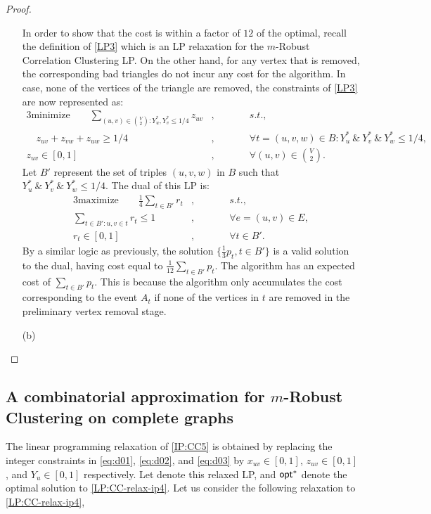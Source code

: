 \begin{proof}
\begin{enumerate}
In order to show that the cost is within a factor of $12$ of the optimal, recall the definition of \ref{LP3} which is an LP relaxation for the $m$-Robust Correlation Clustering LP. 
On the other hand, for any vertex that is removed, the corresponding bad triangles do not incur any cost for the algorithm. In case, none of the vertices of the triangle are removed, the constraints of \ref{LP3} are now represented as:
\begin{alignat}{3} \label{LP:CC-relax-reduced:2}
		\text{minimize} \qquad \sum_{(u,v) \in \binom{V}{2} : Y_u^*, Y_v^* \le 1/4} z_{uv}&, \qquad &&s.t., \nonumber\\
		\quad z_{uv} + z_{vw} + z_{uw} \ge 1/4 &, \qquad &&\forall t = (u,v,w) \in B : Y_u^* \ \&\ Y_v^* \ \&\ Y_w^* \le 1/4, \nonumber\\
		z_{uv} \in [ 0,1 ]&, \qquad &&\forall (u,v) \in \binom{V}{2}. \tag{LP4}
\end{alignat}
Let $B'$ represent the set of triples $(u,v,w)$ in $B$ such that $Y_u^* \ \&\ Y_v^* \ \&\ Y_w^* \le 1/4$.
The dual of this LP is:
\begin{alignat}{3} \label{LP:CC-relax-reduced-dual:2}
		\text{maximize}\qquad \frac{1}{4} \sum_{t \in B'} r_t &, && \qquad s.t., \nonumber\\
		\sum_{t \in B' : u,v \in t} r_t \le 1 &, &&\qquad \forall e = (u,v) \in E, \nonumber\\
		r_{t} \in [ 0,1 ] &, &&\qquad \forall t \in B'.\tag{LP5}
\end{alignat}
By a similar logic as previously, the solution $\{ \frac{1}{3} p_t, t \in B'\}$ is a valid solution to the dual, having cost equal to $\frac{1}{12} \sum_{t \in B'} p_t$. The algorithm has an expected cost of $\sum_{t \in B'} p_t$. This is because the algorithm only accumulates the cost corresponding to the event $A_t$ if none of the vertices in $t$ are removed in the preliminary vertex removal stage.
    \item[(b)]
\end{enumerate}

\end{proof}


\subsection{A combinatorial approximation for $m$-Robust Clustering on complete graphs}

The linear programming relaxation of \ref{IP:CC5} is obtained by replacing the integer constraints in \eqref{eq:d01}, \eqref{eq:d02}, and \eqref{eq:d03} by $x_{uv} \in [0,1]$, $z_{uv} \in [0,1]$, and $Y_u \in[0,1]$ respectively. Let  denote this relaxed LP, and $\mathsf{opt}^*$ denote the optimal solution to \ref{LP:CC-relax-ip4}. Let us consider the following relaxation to \ref{LP:CC-relax-ip4},

